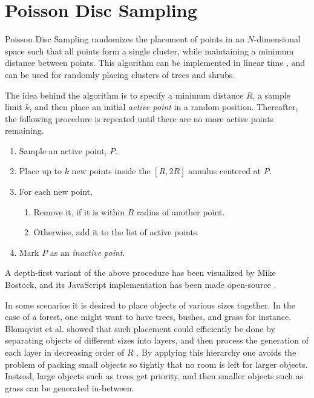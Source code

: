 \section{Poisson Disc Sampling}

Poisson Disc Sampling randomizes the placement of points in an $N$-dimensional space such that all points form a single cluster, while maintaining a minimum distance between points.
This algorithm can be implemented in linear time \cite{poisson_fast}, and can be used for randomly placing clusters of trees and shrubs.


The idea behind the algorithm is to specify a minimum distance $R$, a sample limit $k$, and then place an initial \textit{active point} in a random position.
Thereafter, the following procedure is repeated until there are no more active points remaining.
\vspace{-0.5cm} %
\begin{enumerate}
  \item Sample an active point, $P$.
  \item Place up to $k$ new points inside the $[R, 2R]$ annulus centered at $P$.
  \item For each new point,
  \begin{enumerate}
    \item Remove it, if it is within $R$ radius of another point.
    \item Otherwise, add it to the list of active points.
  \end{enumerate}
  \item Mark $P$ as an \textit{inactive point}.
\end{enumerate}

A depth-first variant of the above procedure has been visualized by Mike Bostock, and its JavaScript implementation has been made open-source \cite{poisson_demo}.

In some scenarios it is desired to place objects of various sizes together.
In the case of a forest, one might want to have trees, bushes, and grass for instance.
Blomqvist et al. showed that such placement could efficiently be done by separating objects of different sizes into layers, and then process the generation of each layer in decreasing order of $R$ \cite[p.32]{ba_landscape}.
By applying this hierarchy one avoids the problem of packing small objects so tightly that no room is left for larger objects.
Instead, large objects such as trees get priority, and then smaller objects such as grass can be generated in-between.